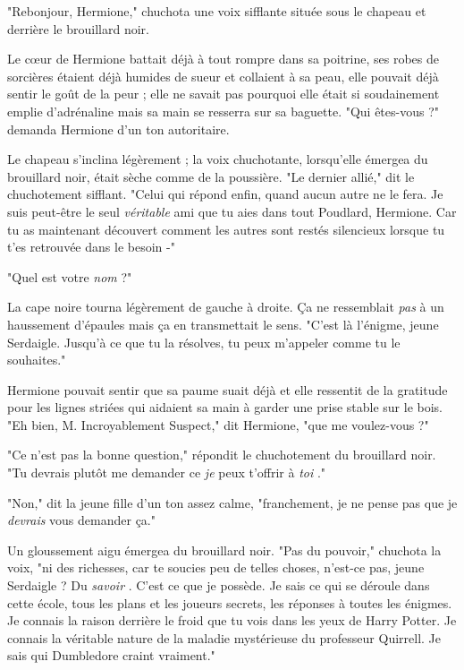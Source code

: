 "Rebonjour, Hermione," chuchota une voix sifflante située sous le chapeau et derrière le brouillard noir.

Le cœur de Hermione battait déjà à tout rompre dans sa poitrine, ses robes de sorcières étaient déjà humides de sueur et collaient à sa peau, elle pouvait déjà sentir le goût de la peur ; elle ne savait pas pourquoi elle était si soudainement emplie d'adrénaline mais sa main se resserra sur sa baguette. "Qui êtes-vous ?" demanda Hermione d'un ton autoritaire.

Le chapeau s'inclina légèrement ; la voix chuchotante, lorsqu'elle émergea du brouillard noir, était sèche comme de la poussière. "Le dernier allié," dit le chuchotement sifflant. "Celui qui répond enfin, quand aucun autre ne le fera. Je suis peut-être le seul \emph{véritable}  ami que tu aies dans tout Poudlard, Hermione. Car tu as maintenant découvert comment les autres sont restés silencieux lorsque tu t'es retrouvée dans le besoin -"

"Quel est votre \emph{nom}  ?"

La cape noire tourna légèrement de gauche à droite. Ça ne ressemblait \emph{pas}  à un haussement d'épaules mais ça en transmettait le sens. "C'est là l'énigme, jeune Serdaigle. Jusqu'à ce que tu la résolves, tu peux m'appeler comme tu le souhaites."

Hermione pouvait sentir que sa paume suait déjà et elle ressentit de la gratitude pour les lignes striées qui aidaient sa main à garder une prise stable sur le bois. "Eh bien, M. Incroyablement Suspect," dit Hermione, "que me voulez-vous ?"

"Ce n'est pas la bonne question," répondit le chuchotement du brouillard noir. "Tu devrais plutôt me demander ce \emph{je}  peux t'offrir à \emph{toi} ."

"Non," dit la jeune fille d'un ton assez calme, "franchement, je ne pense pas que je \emph{devrais}  vous demander ça."

Un gloussement aigu émergea du brouillard noir. "Pas du pouvoir," chuchota la voix, "ni des richesses, car te soucies peu de telles choses, n'est-ce pas, jeune Serdaigle ? Du \emph{savoir} . C'est ce que je possède. Je sais ce qui se déroule dans cette école, tous les plans et les joueurs secrets, les réponses à toutes les énigmes. Je connais la raison derrière le froid que tu vois dans les yeux de Harry Potter. Je connais la véritable nature de la maladie mystérieuse du professeur Quirrell. Je sais qui Dumbledore craint vraiment."

